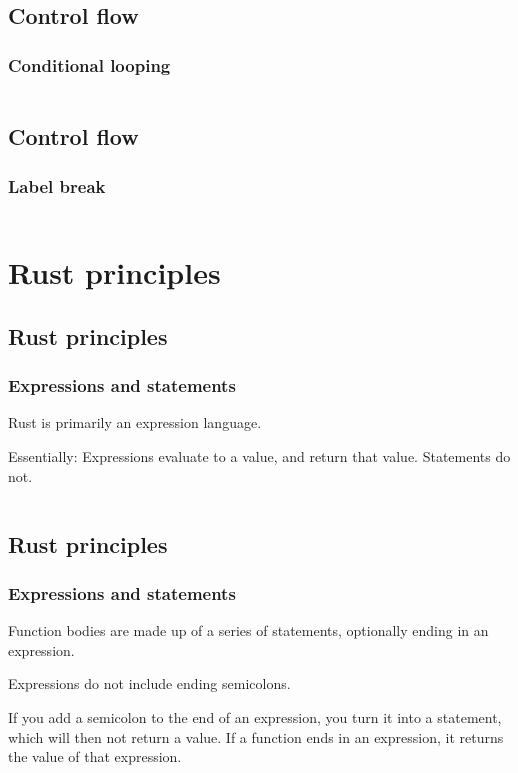 \documentclass[usenames,twocolumn,dvipsnames,10pt,a4wide]{article}
\begin{document}
\subsection{Control flow}
	\subsubsection{Conditional looping}
\inputminted[fontsize=\normalsize]{rust}{code/control2.rs}



\subsection{Control flow}
	\subsubsection{Label break}
\inputminted[fontsize=\normalsize]{rust}{code/control3.rs}



\section{Rust principles}
\subsection{Rust principles}
\subsubsection{Expressions and statements}
\large{Rust is primarily an expression language.}

Essentially: Expressions evaluate to a value, and
return that value. Statements do not.

\inputminted[fontsize=\normalsize]{rust}{code/expression1.rs}


\subsection{Rust principles}
\subsubsection{Expressions and statements}
\normalsize
Function bodies are made up of a series of statements, 
optionally ending in an expression.


Expressions do not include ending semicolons.


If you add a semicolon to the end of an expression, you turn 
it into a statement, which will then not return a value.
If a function ends in an expression, it returns the value of
that expression.
\end{document}
